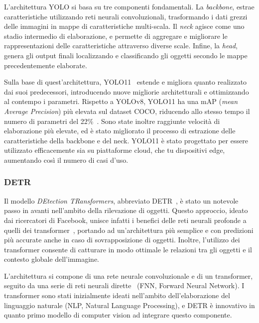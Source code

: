 \documentclass[12pt]{report}
\begin{document}
L'architettura YOLO si basa su tre componenti fondamentali. La \textit{backbone}, estrae caratteristiche utilizzando reti neurali convoluzionali, trasformando i dati grezzi delle immagini in mappe di caratteristiche multi-scala. Il \textit{neck} agisce come uno stadio intermedio di elaborazione, e permette di aggregare e migliorare le rappresentazioni delle caratteristiche attraverso diverse scale. Infine, la \textit{head}, genera gli output finali localizzando e classificando gli oggetti secondo le mappe precedentemente elaborate.

Sulla base di quest'architettura, YOLO11~\cite{yolo11_ultralytics} estende e migliora quanto realizzato dai suoi predecessori, introducendo nuove migliorie architetturali e ottimizzando al contempo i parametri. Rispetto a YOLOv8, YOLO11 ha una mAP (\textit{mean Average Precision}) più elevata sul dataset COCO, riducendo allo stesso tempo il numero di parametri del 22\%~\cite{khanam2024yolov11overviewkeyarchitectural}. Sono state inoltre raggiunte velocità di elaborazione più elevate, ed è stato migliorato il processo di estrazione delle caratteristiche della backbone e del neck. YOLO11 è stato progettato per essere utilizzato efficacemente sia su piattaforme cloud, che tu dispositivi edge, aumentando così il numero di casi d'uso.

\subsubsection{DETR}
\label{sec:detr}

Il modello \textit{DEtection TRansformers}, abbreviato DETR~\cite{carion2020end}, è stato un notevole passo in avanti nell'ambito della rilevazione di oggetti. Questo approccio, ideato dai ricercatori di Facebook, unisce infatti i benefici delle reti neurali profonde a quelli dei transformer~\cite{10.1145/3505244}, portando ad un'architettura più semplice e con predizioni più accurate anche in caso di sovrapposizione di oggetti. Inoltre, l'utilizzo dei transformer consente di catturare in modo ottimale le relazioni tra gli oggetti e il contesto globale dell'immagine.

L'architettura si compone di una rete neurale convoluzionale e di un transformer, seguito da una serie di reti neurali dirette~\cite{article_890416} (FNN, Forward Neural Network). I transformer sono stati inizialmente ideati nell'ambito dell'elaborazione del linguaggio naturale (NLP, Natural Language Processing), e DETR è innovativo in quanto primo modello di computer vision ad integrare questo componente.
\end{document}
